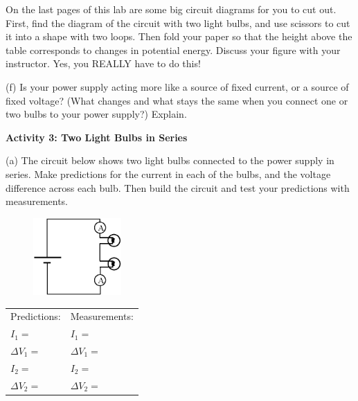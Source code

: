 On the last pages of this lab are some big circuit diagrams for you to cut out.  First, find the diagram of the circuit with two light bulbs, and use scissors to cut it into a shape with two loops.  Then fold your paper so that the height above the table corresponds to changes in potential energy.  Discuss your figure with your instructor.  Yes, you REALLY have to do this! 
\vspace{0.2 in}

(f) Is your power supply acting more like a source of fixed current, or a source of fixed voltage?  (What changes and what stays the same when you connect one or two bulbs to your power supply?) Explain.
\vspace{0.6 in}

\textbf{Activity 3: Two Light Bulbs in Series} \par
\nopagebreak
(a) The circuit below shows two light bulbs connected to the power supply in series.  Make predictions for the current in each of the bulbs, and the voltage difference across each bulb.  Then build the circuit and test your predictions with measurements.  \par

\begin{figure}
    \vspace{-1.1 in}
    \includegraphics[width=0.3\textwidth]{electric_circuits/circ_diag4.eps}
\end{figure}

\vspace{0.1 in}
\renewcommand{\arraystretch}{1.6}
\hspace*{0.5in}
\begin{tabular}{l l}
Predictions: \hspace{0.5in} & Measurements: \\
$I_1 =$ & $I_1 =$ \\
$\Delta V_1 =$ & $\Delta V_1 =$ \\
$I_2 =$ & $I_2 =$ \\
$\Delta V_2 =$ & $\Delta V_2 =$ \\
\end{tabular}
\renewcommand{\arraystretch}{1.0}
\vspace{0.3in}

